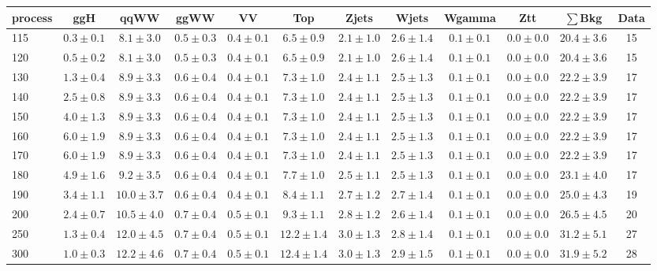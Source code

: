 \begin{table}
{\footnotesize
 \begin{center}
 \begin{tabular}{l c c c c c c c c c c c }
 \hline
 process & ggH & qqWW & ggWW & VV & Top & Zjets & Wjets & Wgamma & Ztt & $\sum$Bkg & Data \\
 \hline
115 & $0.3\pm0.1$ & $8.1\pm3.0$ & $0.5\pm0.3$ & $0.4\pm0.1$ & $6.5\pm0.9$ & $2.1\pm1.0$ & $2.6\pm1.4$ & $0.1\pm0.1$ & $0.0\pm0.0$ & $20.4\pm3.6$ & 15 \\
120 & $0.5\pm0.2$ & $8.1\pm3.0$ & $0.5\pm0.3$ & $0.4\pm0.1$ & $6.5\pm0.9$ & $2.1\pm1.0$ & $2.6\pm1.4$ & $0.1\pm0.1$ & $0.0\pm0.0$ & $20.4\pm3.6$ & 15 \\
130 & $1.3\pm0.4$ & $8.9\pm3.3$ & $0.6\pm0.4$ & $0.4\pm0.1$ & $7.3\pm1.0$ & $2.4\pm1.1$ & $2.5\pm1.3$ & $0.1\pm0.1$ & $0.0\pm0.0$ & $22.2\pm3.9$ & 17 \\
140 & $2.5\pm0.8$ & $8.9\pm3.3$ & $0.6\pm0.4$ & $0.4\pm0.1$ & $7.3\pm1.0$ & $2.4\pm1.1$ & $2.5\pm1.3$ & $0.1\pm0.1$ & $0.0\pm0.0$ & $22.2\pm3.9$ & 17 \\
150 & $4.0\pm1.3$ & $8.9\pm3.3$ & $0.6\pm0.4$ & $0.4\pm0.1$ & $7.3\pm1.0$ & $2.4\pm1.1$ & $2.5\pm1.3$ & $0.1\pm0.1$ & $0.0\pm0.0$ & $22.2\pm3.9$ & 17 \\
160 & $6.0\pm1.9$ & $8.9\pm3.3$ & $0.6\pm0.4$ & $0.4\pm0.1$ & $7.3\pm1.0$ & $2.4\pm1.1$ & $2.5\pm1.3$ & $0.1\pm0.1$ & $0.0\pm0.0$ & $22.2\pm3.9$ & 17 \\
170 & $6.0\pm1.9$ & $8.9\pm3.3$ & $0.6\pm0.4$ & $0.4\pm0.1$ & $7.3\pm1.0$ & $2.4\pm1.1$ & $2.5\pm1.3$ & $0.1\pm0.1$ & $0.0\pm0.0$ & $22.2\pm3.9$ & 17 \\
180 & $4.9\pm1.6$ & $9.2\pm3.5$ & $0.6\pm0.4$ & $0.4\pm0.1$ & $7.7\pm1.0$ & $2.5\pm1.1$ & $2.5\pm1.3$ & $0.1\pm0.1$ & $0.0\pm0.0$ & $23.1\pm4.0$ & 17 \\
190 & $3.4\pm1.1$ & $10.0\pm3.7$ & $0.6\pm0.4$ & $0.4\pm0.1$ & $8.4\pm1.1$ & $2.7\pm1.2$ & $2.7\pm1.4$ & $0.1\pm0.1$ & $0.0\pm0.0$ & $25.0\pm4.3$ & 19 \\
200 & $2.4\pm0.7$ & $10.5\pm4.0$ & $0.7\pm0.4$ & $0.5\pm0.1$ & $9.3\pm1.1$ & $2.8\pm1.2$ & $2.6\pm1.4$ & $0.1\pm0.1$ & $0.0\pm0.0$ & $26.5\pm4.5$ & 20 \\
250 & $1.3\pm0.4$ & $12.0\pm4.5$ & $0.7\pm0.4$ & $0.5\pm0.1$ & $12.2\pm1.4$ & $3.0\pm1.3$ & $2.8\pm1.4$ & $0.1\pm0.1$ & $0.0\pm0.0$ & $31.2\pm5.1$ & 27 \\
300 & $1.0\pm0.3$ & $12.2\pm4.6$ & $0.7\pm0.4$ & $0.5\pm0.1$ & $12.4\pm1.4$ & $3.0\pm1.3$ & $2.9\pm1.5$ & $0.1\pm0.1$ & $0.0\pm0.0$ & $31.9\pm5.2$ & 28 \\

\end{tabular}
\end{center}}
\end{table}
